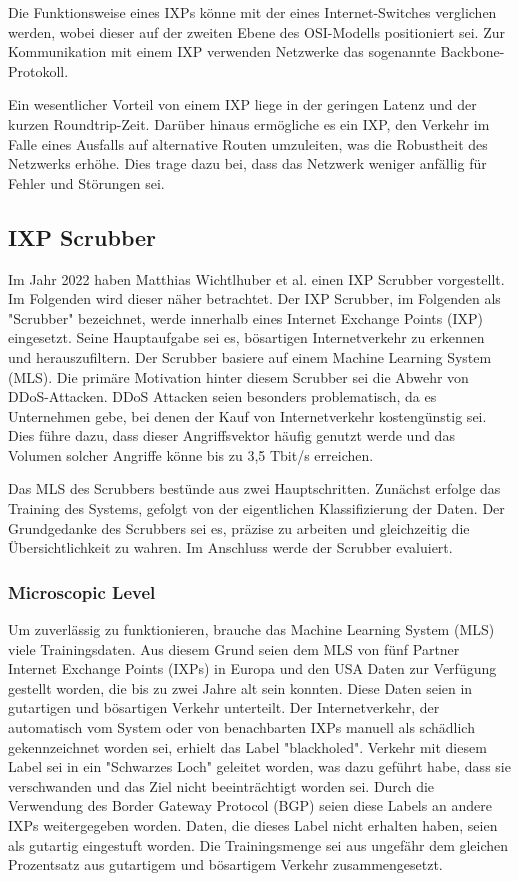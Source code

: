 \documentclass[sigplan,screen]{acmart}
\begin{document}
Die Funktionsweise eines IXPs könne mit der eines Internet-Switches verglichen werden, wobei dieser auf der zweiten Ebene des OSI-Modells positioniert sei. Zur Kommunikation mit einem IXP verwenden Netzwerke das sogenannte Backbone-Protokoll.

Ein wesentlicher Vorteil von einem IXP liege in der geringen Latenz und der kurzen Roundtrip-Zeit. Darüber hinaus ermögliche es ein IXP, den Verkehr im Falle eines Ausfalls auf alternative Routen umzuleiten, was die Robustheit des Netzwerks erhöhe. Dies trage dazu bei, dass das Netzwerk weniger anfällig für Fehler und Störungen sei. \cite{ixp01}

\subsection{IXP Scrubber}
Im Jahr 2022 haben Matthias Wichtlhuber et al. \cite{Hohlfeld01} einen IXP Scrubber vorgestellt. Im Folgenden wird dieser näher betrachtet. Der IXP Scrubber, im Folgenden als "Scrubber" bezeichnet, werde innerhalb eines Internet Exchange Points (IXP) eingesetzt. Seine Hauptaufgabe sei es, bösartigen Internetverkehr zu erkennen und herauszufiltern. Der Scrubber basiere auf einem Machine Learning System (MLS). Die primäre Motivation hinter diesem Scrubber sei die Abwehr von DDoS-Attacken. DDoS Attacken seien besonders problematisch, da es Unternehmen gebe, bei denen der Kauf von Internetverkehr kostengünstig sei. Dies führe dazu, dass dieser Angriffsvektor häufig genutzt werde und das Volumen solcher Angriffe könne bis zu 3,5 Tbit/s erreichen.

Das MLS des Scrubbers bestünde aus zwei Hauptschritten. Zunächst erfolge das Training des Systems, gefolgt von der eigentlichen Klassifizierung der Daten. Der Grundgedanke des Scrubbers sei es, präzise zu arbeiten und gleichzeitig die Übersichtlichkeit zu wahren. Im Anschluss werde der Scrubber evaluiert.

\subsubsection{Microscopic Level}
Um zuverlässig zu funktionieren, brauche das Machine Learning System (MLS) viele Trainingsdaten. Aus diesem Grund seien dem MLS von fünf Partner Internet Exchange Points (IXPs) in Europa und den USA Daten zur Verfügung gestellt worden, die bis zu zwei Jahre alt sein konnten. Diese Daten seien in gutartigen und bösartigen Verkehr unterteilt. Der Internetverkehr, der automatisch vom System oder von benachbarten IXPs manuell als schädlich gekennzeichnet worden sei, erhielt das Label "blackholed". Verkehr mit diesem Label sei in ein "Schwarzes Loch" geleitet worden, was dazu geführt habe, dass sie verschwanden und das Ziel nicht beeinträchtigt worden sei. Durch die Verwendung des Border Gateway Protocol (BGP) seien diese Labels an andere IXPs weitergegeben worden. \cite{blackhole01}
Daten, die dieses Label nicht erhalten haben, seien als gutartig eingestuft worden. Die Trainingsmenge sei aus ungefähr dem gleichen Prozentsatz aus gutartigem und bösartigem Verkehr zusammengesetzt.
\end{document}
